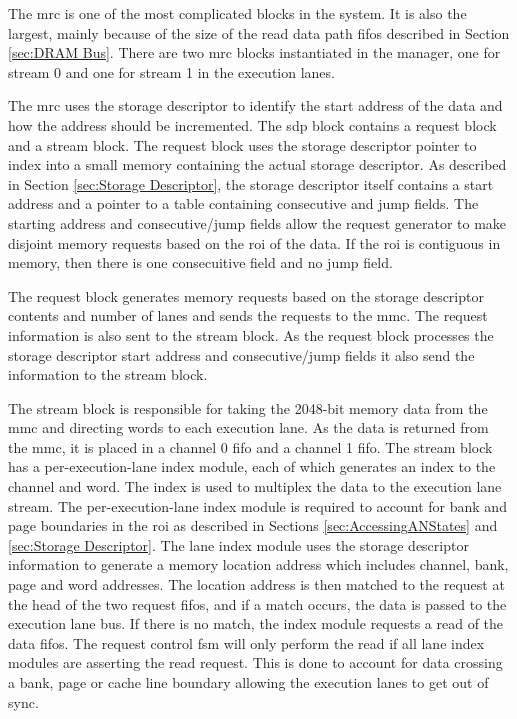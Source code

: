 The \ac{mrc} is one of the most complicated blocks in the system.  It is also the largest, mainly because of the size of the read data path \acp{fifo} described in Section \ref{sec:DRAM Bus}.
There are two \ac{mrc} blocks instantiated in the manager, one for stream 0 and one for stream 1 in the execution lanes.

The \ac{mrc} uses the storage descriptor to identify the start address of the data and how the address should be incremented.
The \ac{sdp} block contains a request block and a stream block.
The request block uses the storage descriptor pointer to index into a small memory containing the actual storage descriptor. 
As described in Section \ref{sec:Storage Descriptor}, the storage descriptor itself contains a start address and a pointer to a table containing consecutive and jump fields.
The starting address and consecutive/jump fields allow the request generator to make disjoint memory requests based on the \ac{roi} of the data. 
If the \ac{roi} is contiguous in memory, then there is one consecuitive field and no jump field.

The request block generates memory requests based on the storage descriptor contents and number of lanes and sends the requests to the \ac{mmc}.
The request information is also sent to the stream block.
As the request block processes the storage descriptor start address and consecutive/jump fields it also send the information to the stream block.

The stream block is responsible for taking the 2048-bit memory data from the \ac{mmc} and directing words to each execution lane.
As the data is returned from the \ac{mmc}, it is placed in a channel 0 \ac{fifo} and a channel 1 \ac{fifo}. 
The stream block has a per-execution-lane index module, each of which generates an index to the channel and word.
The index is used to multiplex the data to the execution lane stream.
The per-execution-lane index module is required to account for bank and page boundaries in the \ac{roi} as described in Sections \ref{sec:AccessingANStates} and \ref{sec:Storage Descriptor}.
The lane index module uses the storage descriptor information to generate a memory location address which includes channel, bank, page and word addresses.
The location address is then matched to the request at the head of the two request \acp{fifo}, and if a match occurs, the data is passed to the execution lane bus.
If there is no match, the index module requests a read of the data \acp{fifo}. The request control \ac{fsm} will only perform the read if all lane index modules are asserting the read request.
This is done to account for data crossing a bank, page or cache line boundary allowing the execution lanes to get out of sync.


